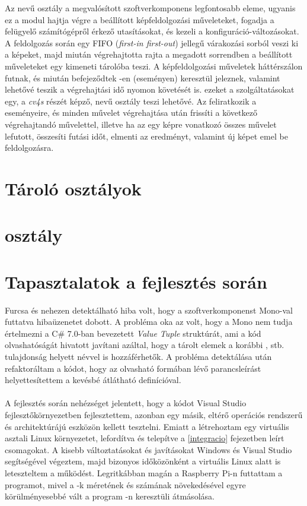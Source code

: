 Az  nevű osztály a megvalósított szoftverkomponens legfontosabb eleme, ugyanis ez a modul hajtja végre a beállított képfeldolgozási műveleteket, fogadja a felügyelő számítógépről érkező utasításokat, és kezeli a konfiguráció-változásokat. \\
A feldolgozás során egy FIFO (\textit{first-in first-out}) jellegű várakozási sorból veszi ki a képeket, majd miután végrehajtotta rajta a megadott sorrendben a beállított műveleteket egy kimeneti tárolóba teszi. A képfeldolgozási műveletek háttérszálon futnak, és miután befejeződtek -en (eseményen) keresztül jeleznek, valamint lehetővé teszik a végrehajtási idő nyomon követését is. ezeket a szolgáltatásokat egy, a \emph{cv4s} részét képző,  nevű osztály teszi lehetővé. Az  feliratkozik a  eseményeire, és minden művelet végrehajtása után frissíti a következő végrehajtandó művelettel, illetve ha az egy képre vonatkozó összes művelet lefutott, összesíti futási időt, elmenti az eredményt, valamint új képet emel be feldolgozásra.

\section{Tároló osztályok}

\section{ osztály}

\section{Tapasztalatok a fejlesztés során}

Furcsa és nehezen detektálható hiba volt, hogy a szoftverkomponenst Mono-val futtatva  hibaüzenetet dobott. A probléma oka az volt, hogy a Mono nem tudja értelmezni a C\# 7.0-ban bevezetett \textit{Value Tuple} struktúrát, ami a kód olvashatóságát hivatott javítani azáltal, hogy a tárolt elemek a korábbi ,  stb. tulajdonság helyett névvel is hozzáférhetők. A probléma detektálása után refaktoráltam a kódot, hogy az olvasható  formában lévő parancsleírást helyettesítettem a kevésbé átlátható  definícióval. \\
\\
A fejlesztés során nehézséget jelentett, hogy a kódot Visual Studio fejlesztőkörnyezetben fejlesztettem, azonban egy másik, eltérő operációs rendszerű és architektúrájú eszközön kellett tesztelni. Emiatt a létrehoztam egy virtuális asztali Linux környezetet, lefordítva és telepítve a \ref{integracio} fejezetben leírt csomagokat. A kisebb változtatásokat és javításokat Windows és Visual Studio segítségével végeztem, majd bizonyos időközönként a virtuális Linux alatt is leteszteltem a működést. Legritkábban magán a Raspberry Pi-n futtattam a programot, mivel a -k méretének és számának növekedésével egyre körülményesebbé vált a program -n keresztüli átmásolása.